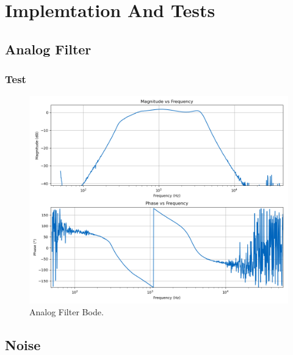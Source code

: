 \section{Implemtation And Tests}

\subsection{Analog Filter}

\subsubsection{Test}

\begin{figure}[H]
    \centering
    \includegraphics*[scale = 0.5]{Images/AnalogFilterScoppyBode.png}
    \caption{Analog Filter Bode.}
    \label{fig:AnalogFilterBodeScoppy}
\end{figure}

\subsection{Noise}

